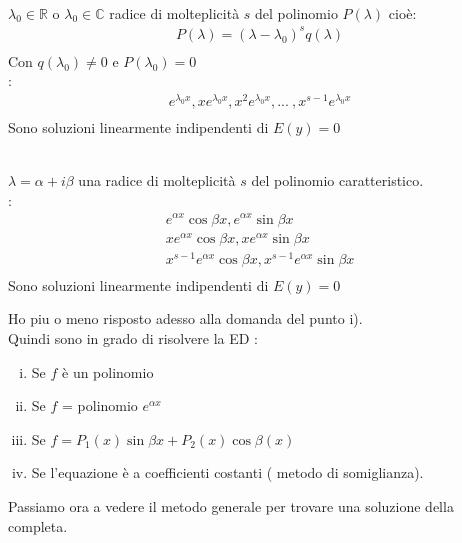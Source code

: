 \documentclass[a4paper, oneside]{article}
\begin{document}
\begin{theorem}
    \hfil\\
     $\lambda_0 \in \mathbb{R} $ o $\lambda_0 \in \mathbb{C}$ radice di molteplicità $s$ del polinomio $P(\lambda)$ cioè:\\
    \begin{gather*}
        P(\lambda) = (\lambda - \lambda_0)^s q(\lambda)\\
    \end{gather*}
    Con $q(\lambda_0) \neq 0$ e $P(\lambda_0) = 0$\\
    :\\
    \begin{gather*}
        e^{\lambda_0 x}, x e^{\lambda_0 x}, x^2 e^{\lambda_0 x}, ... \ , x^{s-1} e^{\lambda_0 x}\\
    \end{gather*}
    Sono soluzioni linearmente indipendenti di $E(y) = 0$
\end{theorem}

\begin{theorem}
    \hfill\\
     $\lambda = \alpha+i\beta$ una radice di molteplicità $s$ del polinomio caratteristico.\\
    :\\
    \begin{gather*}
        e^{\alpha x} \cos \beta x , e^{\alpha x} \sin \beta x\\
        x e^{\alpha x} \cos \beta x ,x e^{\alpha x} \sin \beta x\\
        x^{s-1} e^{\alpha x} \cos \beta x, x^{s-1} e^{\alpha x} \sin \beta x\\
    \end{gather*}
    Sono soluzioni linearmente indipendenti  di $E(y) = 0$\\
\end{theorem}

\begin{proposition}
    Ho piu o meno risposto adesso alla domanda del punto i).\\
    Quindi sono in grado di risolvere la ED :
    \begin{enumerate}[i)]
        \item Se $f$ è un polinomio
        \item Se $f$ = polinomio $e^{\alpha x}$
        \item Se $f = P_1(x) \sin \beta x + P_2(x) \cos \beta(x)$\\
        \item Se l'equazione è a coefficienti costanti ( metodo di somiglianza). 
    \end{enumerate}
    Passiamo ora a vedere il metodo generale per trovare una soluzione della completa.\\
\end{proposition}
\end{document}
